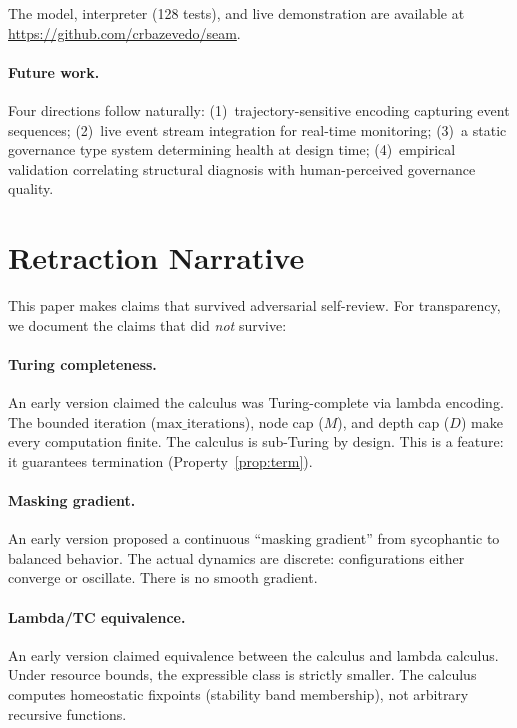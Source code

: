 \documentclass[sigconf,nonacm]{acmart}
\begin{document}
The model, interpreter (128 tests), and live demonstration are
available at
\url{https://github.com/crbazevedo/seam}.

\paragraph{Future work.}
Four directions follow naturally: (1)~trajectory-sensitive encoding
capturing event sequences; (2)~live event stream integration for
real-time monitoring; (3)~a static governance type system determining
health at design time; (4)~empirical validation correlating structural
diagnosis with human-perceived governance quality.


\appendix
\section{Retraction Narrative}

This paper makes claims that survived adversarial self-review. For
transparency, we document the claims that did \emph{not} survive:

\paragraph{Turing completeness.}
An early version claimed the calculus was Turing-complete via lambda
encoding. The bounded iteration ($\mathrm{max\_iterations}$), node cap
($M$), and depth cap ($D$) make every computation finite. The calculus is
sub-Turing by design. This is a feature: it guarantees termination
(Property~\ref{prop:term}).

\paragraph{Masking gradient.}
An early version proposed a continuous ``masking gradient'' from
sycophantic to balanced behavior. The actual dynamics are discrete:
configurations either converge or oscillate. There is no smooth gradient.

\paragraph{Lambda/TC equivalence.}
An early version claimed equivalence between the calculus and lambda
calculus. Under resource bounds, the expressible class is strictly
smaller. The calculus computes homeostatic fixpoints (stability band
membership), not arbitrary recursive functions.
\end{document}
